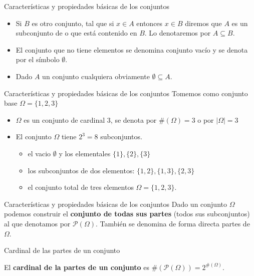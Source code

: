 \documentclass[
  ignorenonframetext,
  aspectratio=169]{beamer}
\providecommand{\tightlist}{%
  \setlength{\itemsep}{0pt}\setlength{\parskip}{0pt}}\usepackage{longtable,booktabs,array}
\begin{document}
\begin{frame}{Características y propiedades básicas de los conjuntos}
\protect\hypertarget{caracteruxedsticas-y-propiedades-buxe1sicas-de-los-conjuntos-1}{}
\begin{itemize}
\tightlist
\item
  Si \(B\) es otro conjunto, tal que si \(x\in A\) entonces \(x\in B\)
  diremos que \(A\) es un subconjunto de o que está contenido en \(B\).
  Lo denotaremos por \(A\subseteq B.\)
\item
  El conjunto que no tiene elementos se denomina conjunto vacío y se
  denota por el símbolo \(\emptyset\).
\item
  Dado \(A\) un conjunto cualquiera obviamente \(\emptyset\subseteq A.\)
\end{itemize}
\end{frame}

\begin{frame}{Características y propiedades básicas de los conjuntos}
\protect\hypertarget{caracteruxedsticas-y-propiedades-buxe1sicas-de-los-conjuntos-2}{}
Tomemos como conjunto base \(\Omega=\{1,2,3\}\)

\begin{itemize}
\tightlist
\item
  \(\Omega\) es un conjunto de cardinal 3, se denota por
  \(\#(\Omega)=3\) o por \(|\Omega|=3\)
\item
  El conjunto \(\Omega\) tiene \(2^3=8\) subconjuntos.

  \begin{itemize}
  \tightlist
  \item
    el vacio \(\emptyset\) y los elementales \(\{1\},\{2\},\{3\}\)
  \item
    los subconjuntos de dos elementos: \(\{1,2\},\{1,3\},\{2,3\}\)
  \item
    el conjunto total de tres elementos \(\Omega=\{1,2,3\}.\)
  \end{itemize}
\end{itemize}
\end{frame}

\begin{frame}{Características y propiedades básicas de los conjuntos}
\protect\hypertarget{caracteruxedsticas-y-propiedades-buxe1sicas-de-los-conjuntos-3}{}
Dado un conjunto \(\Omega\) podemos construir el \textbf{conjunto de
todas sus partes} (todos sus subconjuntos) al que denotamos por
\(\mathcal{P}(\Omega)\). También se denomina de forma directa partes de
\(\Omega\).

Cardinal de las partes de un conjunto

El \textbf{cardinal de la partes de un conjunto} es
\(\#(\mathcal{P}(\Omega))=2^{\#(\Omega)}.\)
\end{frame}
\end{document}
